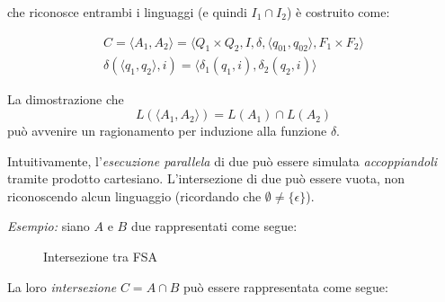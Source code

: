 \documentclass[italian, 10pt]{article}
\begin{document}
\FSA che riconosce entrambi i linguaggi (e quindi \(I_1 \cap I_2\)) è costruito come:

\begin{gather*}
  C = \langle A_1, A_2 \rangle = \langle Q_1 \times Q_2, I, \delta, \langle q_{01}, q_{02} \rangle, F_1 \times F_2 \rangle \\
  \delta(\langle q_1, q_2 \rangle, i)  = \langle \delta_1 (q_1, i), \delta_2(q_2, i) \rangle
\end{gather*}

\bigskip
La dimostrazione che
\[ L \left( \langle A_1, A_2 \rangle \right) = L\left(A_1\right) \cap L\left(A_2\right) \]
può avvenire un ragionamento per induzione alla funzione \(\delta\).

\bigskip
Intuitivamente, l'\textit{esecuzione parallela} di due \FSA può essere simulata \textit{accoppiandoli} tramite prodotto cartesiano.
L'intersezione di due \FSA può essere vuota, non riconoscendo alcun linguaggio (ricordando che \(\emptyset \neq \{\epsilon\}\)).

\bigskip
\textit{Esempio:} siano \(A\) e \(B\) due \FSA rappresentati come segue:

\begin{figure}[htbp]
  \bigskip
  \centering
  \caption{Intersezione tra FSA}
  \label{fig:intersezione-FSA-1}
  \bigskip
\end{figure}

La loro \textit{intersezione} \(C = A \cap B\) può essere rappresentata come segue:
\end{document}
